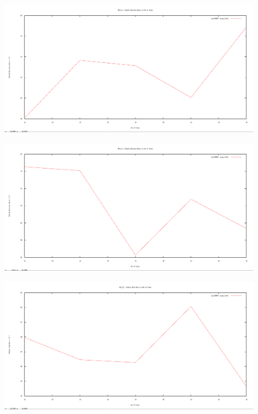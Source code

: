 \documentclass[12pt]{article}
\begin{document}
\begin{figure}[H]
	\centering
	\includegraphics[scale=	0.26]{image/bpics/bm_packetdeliveryratio_vs_flows.png}
\end{figure}

\begin{figure}[H]
	\centering
	\includegraphics[scale=	0.26]{image/apics/am_packetdeliveryratio_vs_flows.png}
\end{figure}


\begin{figure}[H]
	\centering
	\includegraphics[scale=	0.26]{image/bpics/bm_packetdropratio_vs_flows.png}
\end{figure}
\end{document}
